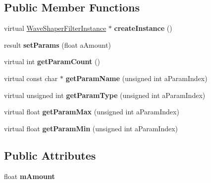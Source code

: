 \subsection*{Public Member Functions}
\begin{DoxyCompactItemize}
\item 
\mbox{\label{class_so_loud_1_1_wave_shaper_filter_ad43c32b01ec791bab7d1070b6290471e}} 
virtual \mbox{\hyperlink{class_so_loud_1_1_wave_shaper_filter_instance}{Wave\+Shaper\+Filter\+Instance}} $\ast$ {\bfseries create\+Instance} ()
\item 
\mbox{\label{class_so_loud_1_1_wave_shaper_filter_aa5b261fa336443664d1cb273960d2e0e}} 
result {\bfseries set\+Params} (float a\+Amount)
\item 
\mbox{\label{class_so_loud_1_1_wave_shaper_filter_ab113f9768e6970bbc8c5f815e4b0c2a1}} 
virtual int {\bfseries get\+Param\+Count} ()
\item 
\mbox{\label{class_so_loud_1_1_wave_shaper_filter_ac54c4c3de8423e9097c29595bcc32ba0}} 
virtual const char $\ast$ {\bfseries get\+Param\+Name} (unsigned int a\+Param\+Index)
\item 
\mbox{\label{class_so_loud_1_1_wave_shaper_filter_afa0e96d90253cc7040b4fcf1a282bb75}} 
virtual unsigned int {\bfseries get\+Param\+Type} (unsigned int a\+Param\+Index)
\item 
\mbox{\label{class_so_loud_1_1_wave_shaper_filter_ae54f5fddce18ef45c1af8e10fbf53f48}} 
virtual float {\bfseries get\+Param\+Max} (unsigned int a\+Param\+Index)
\item 
\mbox{\label{class_so_loud_1_1_wave_shaper_filter_a7baec6ccc3a119a22ef67e449a6331c0}} 
virtual float {\bfseries get\+Param\+Min} (unsigned int a\+Param\+Index)
\end{DoxyCompactItemize}
\subsection*{Public Attributes}
\begin{DoxyCompactItemize}
\item 
\mbox{\label{class_so_loud_1_1_wave_shaper_filter_ad154d07258f173fe78dd9d3f123d84ad}} 
float {\bfseries m\+Amount}
\end{DoxyCompactItemize}



